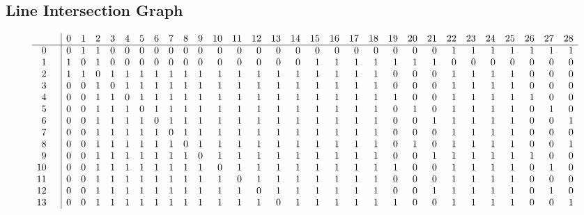 \documentclass{article}
\begin{document}
{\subsection*{Line Intersection Graph}
{\arraycolsep=1pt
$$
\begin{array}{rr|*{29}r}
 &  & 0 & 1 & 2 & 3 & 4 & 5 & 6 & 7 & 8 & 9 & 10 & 11 & 12 & 13 & 14 & 15 & 16 & 17 & 18 & 19 & 20 & 21 & 22 & 23 & 24 & 25 & 26 & 27 & 28\\
\hline
0 &  & 0 & 1 & 1 & 0 & 0 & 0 & 0 & 0 & 0 & 0 & 0 & 0 & 0 & 0 & 0 & 0 & 0 & 0 & 0 & 0 & 0 & 0 & 1 & 1 & 1 & 1 & 1 & 1 & 1\\
1 &  & 1 & 0 & 1 & 0 & 0 & 0 & 0 & 0 & 0 & 0 & 0 & 0 & 0 & 0 & 0 & 1 & 1 & 1 & 1 & 1 & 1 & 1 & 0 & 0 & 0 & 0 & 0 & 0 & 0\\
2 &  & 1 & 1 & 0 & 1 & 1 & 1 & 1 & 1 & 1 & 1 & 1 & 1 & 1 & 1 & 1 & 1 & 1 & 1 & 1 & 0 & 0 & 0 & 1 & 1 & 1 & 1 & 0 & 0 & 0\\
3 &  & 0 & 0 & 1 & 0 & 1 & 1 & 1 & 1 & 1 & 1 & 1 & 1 & 1 & 1 & 1 & 1 & 1 & 1 & 1 & 0 & 0 & 0 & 1 & 1 & 1 & 1 & 0 & 0 & 0\\
4 &  & 0 & 0 & 1 & 1 & 0 & 1 & 1 & 1 & 1 & 1 & 1 & 1 & 1 & 1 & 1 & 1 & 1 & 1 & 1 & 1 & 0 & 0 & 1 & 1 & 1 & 1 & 1 & 0 & 0\\
5 &  & 0 & 0 & 1 & 1 & 1 & 0 & 1 & 1 & 1 & 1 & 1 & 1 & 1 & 1 & 1 & 1 & 1 & 1 & 1 & 0 & 1 & 0 & 1 & 1 & 1 & 1 & 0 & 1 & 0\\
6 &  & 0 & 0 & 1 & 1 & 1 & 1 & 0 & 1 & 1 & 1 & 1 & 1 & 1 & 1 & 1 & 1 & 1 & 1 & 1 & 0 & 0 & 1 & 1 & 1 & 1 & 1 & 0 & 0 & 1\\
7 &  & 0 & 0 & 1 & 1 & 1 & 1 & 1 & 0 & 1 & 1 & 1 & 1 & 1 & 1 & 1 & 1 & 1 & 1 & 1 & 0 & 0 & 0 & 1 & 1 & 1 & 1 & 0 & 0 & 0\\
8 &  & 0 & 0 & 1 & 1 & 1 & 1 & 1 & 1 & 0 & 1 & 1 & 1 & 1 & 1 & 1 & 1 & 1 & 1 & 1 & 0 & 1 & 0 & 1 & 1 & 1 & 1 & 0 & 0 & 1\\
9 &  & 0 & 0 & 1 & 1 & 1 & 1 & 1 & 1 & 1 & 0 & 1 & 1 & 1 & 1 & 1 & 1 & 1 & 1 & 1 & 0 & 0 & 1 & 1 & 1 & 1 & 1 & 1 & 0 & 0\\
10 &  & 0 & 0 & 1 & 1 & 1 & 1 & 1 & 1 & 1 & 1 & 0 & 1 & 1 & 1 & 1 & 1 & 1 & 1 & 1 & 1 & 0 & 0 & 1 & 1 & 1 & 1 & 0 & 1 & 0\\
11 &  & 0 & 0 & 1 & 1 & 1 & 1 & 1 & 1 & 1 & 1 & 1 & 0 & 1 & 1 & 1 & 1 & 1 & 1 & 1 & 0 & 0 & 0 & 1 & 1 & 1 & 1 & 0 & 0 & 0\\
12 &  & 0 & 0 & 1 & 1 & 1 & 1 & 1 & 1 & 1 & 1 & 1 & 1 & 0 & 1 & 1 & 1 & 1 & 1 & 1 & 0 & 0 & 1 & 1 & 1 & 1 & 1 & 0 & 1 & 0\\
13 &  & 0 & 0 & 1 & 1 & 1 & 1 & 1 & 1 & 1 & 1 & 1 & 1 & 1 & 0 & 1 & 1 & 1 & 1 & 1 & 1 & 0 & 0 & 1 & 1 & 1 & 1 & 0 & 0 & 1\\

\end{array}$$}}
\end{document}
